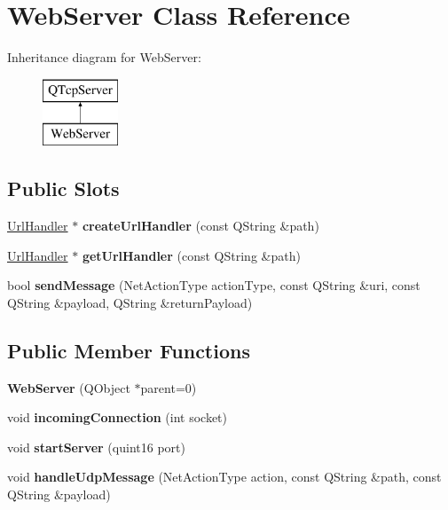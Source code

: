 \hypertarget{class_web_server}{}\section{Web\+Server Class Reference}
\label{class_web_server}
Inheritance diagram for Web\+Server\+:\begin{figure}[H]
\begin{center}
\leavevmode
\includegraphics[height=2.000000cm]{class_web_server}
\end{center}
\end{figure}
\subsection*{Public Slots}
\begin{DoxyCompactItemize}
\item 
\mbox{\label{class_web_server_a991ba62e7d4044e2f85fe1457aa5bad4}} 
\hyperlink{class_url_handler}{Url\+Handler} $\ast$ {\bfseries create\+Url\+Handler} (const Q\+String \&path)
\item 
\mbox{\label{class_web_server_ac2d1d9d11eb504321fc4629b0e045ce3}} 
\hyperlink{class_url_handler}{Url\+Handler} $\ast$ {\bfseries get\+Url\+Handler} (const Q\+String \&path)
\item 
\mbox{\label{class_web_server_ae4a36571bfd26bdd42d75613cc990b1e}} 
bool {\bfseries send\+Message} (Net\+Action\+Type action\+Type, const Q\+String \&uri, const Q\+String \&payload, Q\+String \&return\+Payload)
\end{DoxyCompactItemize}
\subsection*{Public Member Functions}
\begin{DoxyCompactItemize}
\item 
\mbox{\label{class_web_server_a2902a8136514bc5a1217a87b7a99ab13}} 
{\bfseries Web\+Server} (Q\+Object $\ast$parent=0)
\item 
\mbox{\label{class_web_server_ac6a3155a785e42fec310e8457a12d73e}} 
void {\bfseries incoming\+Connection} (int socket)
\item 
\mbox{\label{class_web_server_ad5f434853f45b795976afb32104c03b3}} 
void {\bfseries start\+Server} (quint16 port)
\item 
\mbox{\label{class_web_server_afecc771fdf6bece4ba126ce5299b8b6a}} 
void {\bfseries handle\+Udp\+Message} (Net\+Action\+Type action, const Q\+String \&path, const Q\+String \&payload)
\end{DoxyCompactItemize}
